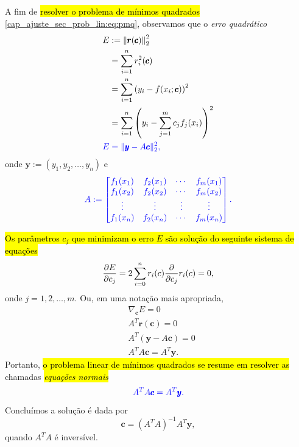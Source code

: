 A fim de \hl{resolver o problema de mínimos quadrados} \eqref{cap_ajuste_sec_prob_lin:eq:pmq}, observamos que o \emph{erro quadrático}
\begin{subequations}
  \begin{align}
    E &:= \left\|\pmb{r}(\pmb{c})\right\|_2^2 \\
      &= \sum_{i=1}^n r_i^2(\pmb{c}) \\
      &= \sum_{i=1}^n \left(y_i - f(x_i; \pmb{c})\right)^2 \\
      &= \sum_{i=1}^n \left(y_i - \sum_{j=1}^m c_jf_j(x_i)\right)^2 \\
    \color{blue}E &\color{blue}= \|\pmb{y} - A\pmb{c}\|_2^2,
\end{align}
\end{subequations}
onde $\pmb{y} := (y_1, y_2, \dotsc, y_n)$ e
\begin{equation}\color{blue}A :=
  \begin{bmatrix}
    f_1(x_1) & f_2(x_1) & \cdots & f_m(x_1) \\
    f_1(x_2) & f_2(x_2) & \cdots & f_m(x_2) \\
    \vdots & \vdots & \vdots & \vdots \\
    f_1(x_n) & f_2(x_n) & \cdots & f_m(x_n)
  \end{bmatrix}.
\end{equation}

\hl{Os parâmetros $c_j$ que minimizam o erro $E$ são solução do seguinte sistema de equações}
\begin{equation}
  \frac{\partial E}{\partial c_j} = 2\sum_{i=0}^n r_i(c)\frac{\partial}{\partial c_j}r_i(c) = 0,
\end{equation}
onde $j=1, 2, \dotsc, m$. Ou, em uma notação mais apropriada,
\begin{align}
  &\nabla_{\pmb{c}} E = 0\\
  &A^T\pmb{r}(\pmb{c}) = 0\\
  &A^T(\pmb{y} - A\pmb{c}) = 0\\
  &A^TA\pmb{c} = A^T\pmb{y}.
\end{align}
Portanto, \hl{o problema linear de mínimos quadrados se resume em resolver as} chamadas \hl{\emph{equações normais}}
\begin{equation}\label{cap_ajuste_sec_prob_lin:eq:equacoes_normais}\color{blue}A^TA\pmb{c}= A^T\pmb{y}.
\end{equation}
Concluímos a solução é dada por
\begin{equation}
  \pmb{c} = (A^TA)^{-1}A^T\pmb{y},
\end{equation}
quando $A^TA$ é inversível.

